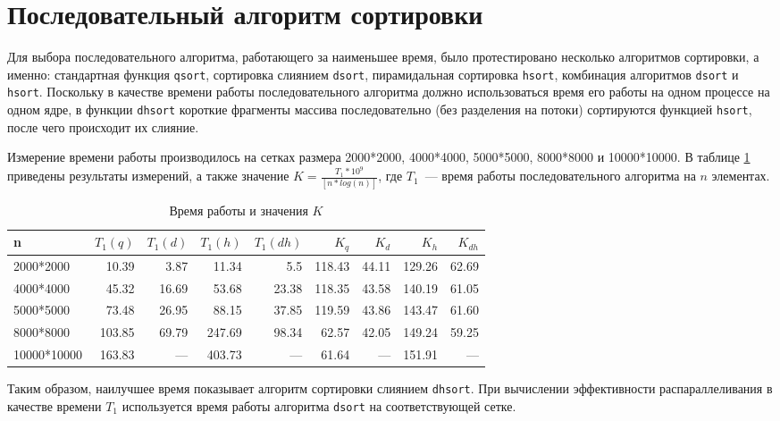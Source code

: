 \documentclass[oneside,final,14pt]{extreport}
\begin{document}
\section*{Последовательный алгоритм сортировки}
\label{seq_alg}
Для выбора последовательного алгоритма, работающего за наименьшее время,
было протестировано несколько алгоритмов сортировки, а именно:
стандартная функция \texttt{qsort}, сортировка слиянием \texttt{dsort},
пирамидальная сортировка \texttt{hsort}, комбинация алгоритмов \texttt{dsort}
и \texttt{hsort}. Поскольку в качестве времени работы последовательного
алгоритма должно использоваться время его работы на одном процессе на одном ядре,
в функции \texttt{dhsort} короткие фрагменты массива последовательно
(без разделения на потоки) сортируются функцией \texttt{hsort}, после
чего происходит их слияние.

Измерение времени работы производилось на сетках размера 2000*2000,
4000*4000, 5000*5000, 8000*8000 и 10000*10000. В таблице \ref{seq_time_tab}
приведены результаты
измерений, а также значение $K = \frac{T_1 * 10^9}{[ n * log(n)]}$, где
$T_1$~--- время работы последовательного алгоритма на $n$ элементах.

\begin{table}[hp]
\centering
\begin{tabular}{|l|r|r|r|r|r|r|r|r|}\hline
    n       & $T_1(q)$ & $T_1(d)$ & $T_1(h)$ & $T_1(dh)$ & $K_q$ & $K_d$ & $K_h$ & $K_{dh}$  \\ \hline
2000*2000   & 10.39    & 3.87     & 11.34    & 5.5       & 118.43& 44.11 & 129.26& 62.69   \\ \hline
4000*4000   & 45.32    & 16.69    & 53.68    & 23.38     & 118.35& 43.58 & 140.19& 61.05   \\ \hline
5000*5000   & 73.48    & 26.95    & 88.15    & 37.85     & 119.59& 43.86 & 143.47& 61.60   \\ \hline
8000*8000   & 103.85   & 69.79    & 247.69   & 98.34     & 62.57 & 42.05 & 149.24& 59.25   \\ \hline
10000*10000 & 163.83   & ---      & 403.73   & ---       & 61.64 & ---   & 151.91& ---     \\ \hline
\end{tabular}
\caption{Время работы и значения $K$}
\label{seq_time_tab}
\end{table}

Таким образом, наилучшее время показывает алгоритм сортировки слиянием
\texttt{dhsort}. При вычислении эффективности распараллеливания в качестве
времени $T_1$ используется время работы алгоритма \texttt{dsort}
на соответствующей сетке.
\end{document}
